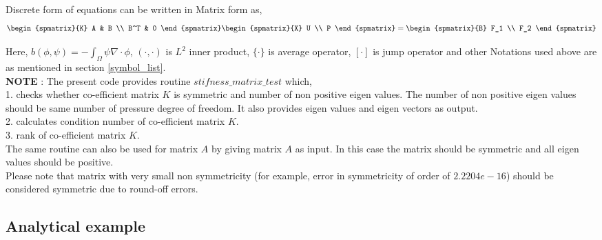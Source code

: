 \documentclass[a4paper,12pt]{book}
\begin{document}
Discrete form of equations can be written in Matrix form as, \\

\begin{equation} \label{Stokes_matrix}
\begin{spmatrix}{K}
    A & B \\
    B^T & 0
\end{spmatrix}
\begin{spmatrix}{X}
    U \\
    P
\end{spmatrix}
=
\begin{spmatrix}{B}
    F_1  \\
    F_2
\end{spmatrix}
\end{equation}

Here, $b(\phi,\psi) = -\int_{\Omega} \psi \nabla \cdot \phi$, $(\cdot , \cdot)$ is $L^2$ inner product, $\{\cdot\}$ is average operator, $[\cdot]$ is jump operator and other Notations used above are as mentioned in section \ref{symbol_list}.\\

\textbf{NOTE} : The present code provides routine $stifness\_matrix\_test$ which, \\

1. checks whether co-efficient matrix $K$ is symmetric and number of non positive eigen values. The number of non positive eigen values should be same number of pressure degree of freedom. It also provides eigen values and eigen vectors as output.\\

2. calculates condition number of co-efficient matrix $K$. \\

3. rank of co-efficient matrix $K$.\\

The same routine can also be used for matrix $A$ by giving matrix $A$ as input. In this case the matrix should be symmetric and all eigen values should be positive.\\

Please note that matrix with very small non symmetricity (for example, error in symmetricity of order of $2.2204e-16$) should be considered symmetric due to round-off errors.

\subsection{Analytical example}
\end{document}
